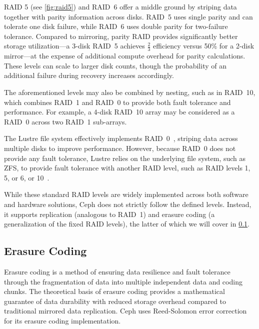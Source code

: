 \noindent\ac{RAID} 5 (see \cref{fig:raid5}) and \ac{RAID}~6 offer a middle ground by striping data together with parity information across disks. \ac{RAID}~5 uses single parity and can tolerate one disk failure, while \ac{RAID}~6 uses double parity for two-failure tolerance. Compared to mirroring, parity \ac{RAID} provides significantly better storage utilization---a 3-disk \ac{RAID}~5 achieves $\frac{2}{3}$ efficiency versus 50\% for a 2-disk mirror---at the expense of additional compute overhead for parity calculations. These levels can scale to larger disk counts, though the probability of an additional failure during recovery increases accordingly.

The aforementioned levels may also be combined by nesting, such as in \ac{RAID}~10, which combines \ac{RAID}~1 and \ac{RAID}~0 to provide both fault tolerance and performance. For example, a 4-disk \ac{RAID}~10 array may be considered as a \ac{RAID}~0 across two \ac{RAID}~1 sub-arrays.

The Lustre file system effectively implements \ac{RAID}~0~\cite[p.~11]{lustre-manual}, striping data across multiple disks to improve performance. However, because \ac{RAID}~0 does not provide any fault tolerance, Lustre relies on the underlying file system, such as ZFS, to provide fault tolerance with another \ac{RAID} level, such as \ac{RAID} levels 1, 5, or 6, or 10~\cite[p.~16]{lustre-manual}.

While these standard \ac{RAID} levels are widely implemented across both software and hardware solutions, Ceph does not strictly follow the defined levels. Instead, it supports replication (analogous to \ac{RAID}~1) and erasure coding (a generalization of the fixed \ac{RAID} levels), the latter of which we will cover in \cref{sec:erasure-coding}.

\subsection{Erasure Coding}
\label{sec:erasure-coding}

Erasure coding is a method of ensuring data resilience and fault tolerance through the fragmentation of data into multiple independent data and coding chunks. The theoretical basis of erasure coding provides a mathematical guarantee of data durability with reduced storage overhead compared to traditional mirrored data replication. Ceph uses Reed-Solomon error correction~\cite{reed-solomon-original-paper} for its erasure coding implementation.

